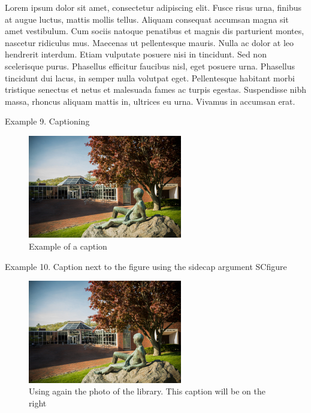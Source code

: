 \documentclass{article}
\begin{document}
\vspace{1.2cm}

Lorem ipsum dolor sit amet, consectetur adipiscing elit. Fusce risus
urna, finibus at augue luctus, mattis mollis tellus. Aliquam consequat
accumsan magna sit amet vestibulum. Cum sociis natoque penatibus et
magnis dis parturient montes, nascetur ridiculus mus. Maecenas ut
pellentesque mauris. Nulla ac dolor at leo hendrerit interdum. Etiam
vulputate posuere nisi in tincidunt. Sed non scelerisque purus. Phasellus
efficitur faucibus nisl, eget posuere urna. Phasellus tincidunt dui
lacus, in semper nulla volutpat eget. Pellentesque habitant morbi
tristique senectus et netus et malesuada fames ac turpis egestas.
Suspendisse nibh massa, rhoncus aliquam mattis in, ultrices eu urna.
Vivamus in accumsan erat.

\newpage


Example 9. Captioning

\begin{figure}[h]
\caption{Example of a caption}
\centering
\includegraphics[width=0.6\textwidth]{library}
\end{figure}


\vspace{1.5cm}

Example 10. Caption next to the figure using the sidecap argument SCfigure
\begin{figure}
\caption{Using again the photo of the library.
         This caption will be on the right}
\includegraphics[width=0.6\textwidth]{library}
\end{figure}
\end{document}
